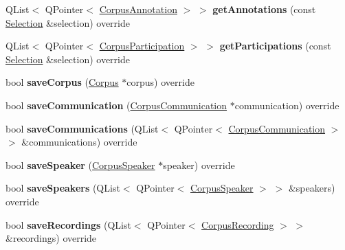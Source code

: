 \begin{DoxyCompactItemize}
Q\+List$<$ Q\+Pointer$<$ \hyperlink{class_corpus_annotation}{Corpus\+Annotation} $>$ $>$ {\bfseries get\+Annotations} (const \hyperlink{class_metadata_datastore_1_1_selection}{Selection} \&selection) override
\item 
\mbox{\label{class_s_q_l_metadata_datastore_a52b211923820eca0a4aaac7fbf5c94b2}} 
Q\+List$<$ Q\+Pointer$<$ \hyperlink{class_corpus_participation}{Corpus\+Participation} $>$ $>$ {\bfseries get\+Participations} (const \hyperlink{class_metadata_datastore_1_1_selection}{Selection} \&selection) override
\item 
\mbox{\label{class_s_q_l_metadata_datastore_a872338df30525ccab41a7048abf0137e}} 
bool {\bfseries save\+Corpus} (\hyperlink{class_corpus}{Corpus} $\ast$corpus) override
\item 
\mbox{\label{class_s_q_l_metadata_datastore_ab3159fa59174fdb30e73f36dbee19a22}} 
bool {\bfseries save\+Communication} (\hyperlink{class_corpus_communication}{Corpus\+Communication} $\ast$communication) override
\item 
\mbox{\label{class_s_q_l_metadata_datastore_ae49a10cb03c7bfe41dc46ea5dec64c46}} 
bool {\bfseries save\+Communications} (Q\+List$<$ Q\+Pointer$<$ \hyperlink{class_corpus_communication}{Corpus\+Communication} $>$ $>$ \&communications) override
\item 
\mbox{\label{class_s_q_l_metadata_datastore_a818441c810fcda84a91b7b590dfca891}} 
bool {\bfseries save\+Speaker} (\hyperlink{class_corpus_speaker}{Corpus\+Speaker} $\ast$speaker) override
\item 
\mbox{\label{class_s_q_l_metadata_datastore_ac56b346dda202021093cf73c8860d2ed}} 
bool {\bfseries save\+Speakers} (Q\+List$<$ Q\+Pointer$<$ \hyperlink{class_corpus_speaker}{Corpus\+Speaker} $>$ $>$ \&speakers) override
\item 
\mbox{\label{class_s_q_l_metadata_datastore_a17a94e9d4ee31382c82fd06999043899}} 
bool {\bfseries save\+Recordings} (Q\+List$<$ Q\+Pointer$<$ \hyperlink{class_corpus_recording}{Corpus\+Recording} $>$ $>$ \&recordings) override

\end{DoxyCompactItemize}
